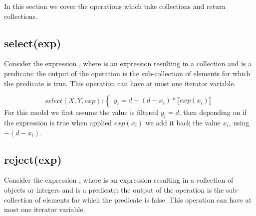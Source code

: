 In this section we cover the operations which take collections and return collections.


\subsection{select(exp)}
Consider the expression , where  is an expression resulting in a collection and  is a predicate: the output of the operation is the sub-collection of elements for which the predicate is true.
This operation can have at most one iterator variable.

\begin{equation}\label{csp:select}
    select(X,Y,exp):
    \begin{cases}
        y_i = d - (d-x_i)*\llbracket exp(x_i) \rrbracket
    \end{cases}
\end{equation}
For this model we first assume the value is filtered $y_i=d$, then depending on if the expression is true when applied $exp(x_i)$ we add it back the value $x_i$, using $-(d-x_i)$.

\subsection{reject(exp)}
Consider the expression , where  is an expression resulting in a collection of objects or integers and  is a predicate: the output of the operation is the sub-collection of elements for which the predicate is false.
This operation can have at most one iterator variable.

